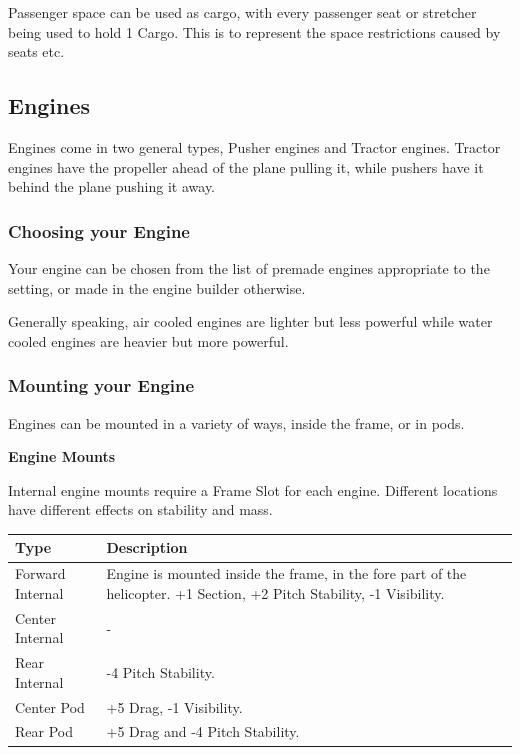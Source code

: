 \documentclass{article}
\begin{document}
Passenger space can be used as cargo, with every passenger seat
or stretcher being used to hold 1 Cargo. This is to represent the space
restrictions caused by seats etc.

\subsection{Engines}
\label{_Engines}

Engines come in two general types, Pusher engines and Tractor engines.
Tractor engines have the propeller ahead of the plane pulling it, while
pushers have it behind the plane pushing it away.

\subsubsection{Choosing your Engine}
\label{_Choosing your Engine}

Your engine can be chosen from the list of premade engines appropriate
to the setting, or made in the engine builder otherwise.

Generally speaking, air cooled engines are lighter but less powerful
while water cooled engines are heavier but more powerful.

\subsubsection{Mounting your Engine}
\label{_Mounting your Engine}

Engines can be mounted in a variety of ways, inside the frame, or in pods.  

\textbf{Engine Mounts}

Internal engine mounts require a Frame Slot for each engine. Different locations have different effects on stability and mass.

\begin{tabular}{|l|l|}
    \hline
    Type & Description \\\hline
    Forward Internal & Engine is mounted inside the frame, in the fore part of the helicopter.  +1 Section, +2 Pitch Stability, -1 Visibility. \\\hline
    Center Internal & - \\\hline
    Rear Internal & -4 Pitch Stability. \\\hline
    Center Pod & +5 Drag, -1 Visibility. \\\hline
    Rear Pod & +5 Drag and -4 Pitch Stability. \\\hline
\end{tabular}
\end{document}
